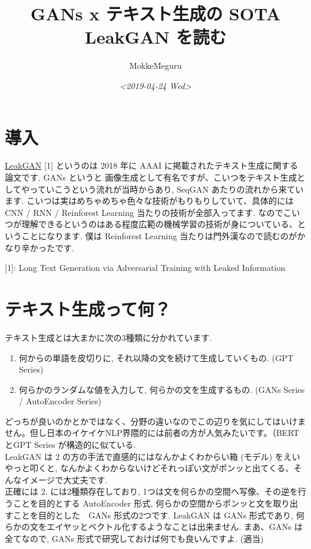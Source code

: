 \documentclass[a4paper, dvipdfmx, 10pt]{article}
\author{MokkeMeguru}
\date{\textit{<2019-04-24 Wed>}}
\title{GANs x テキスト生成の SOTA LeakGAN を読む}
\begin{document}
\maketitle
\tableofcontents

\section{導入}
\label{sec:org51e9dc4}
\href{https://arxiv.org/pdf/1709.08624v2.pdf}{LeakGAN} [1] というのは 2018 年に AAAI に掲載されたテキスト生成に関する論文です. GANs というと 画像生成として有名ですが、こいつをテキスト生成としてやっていこうという流れが当時からあり, SeqGAN あたりの流れから来ています. こいつは実はめちゃめちゃ色々な技術がもりもりしていて、具体的には CNN / RNN / Reinforest Learning 当たりの技術が全部入ってます. なのでこいつが理解できるというのはある程度広範の機械学習の技術が身についている、ということになります. 僕は Reinforest Learning 当たりは門外漢なので読むのがかなり辛かったです.

[1]: Long Text Generation via Adversarial Training with Leaked Information
\section{テキスト生成って何？}
\label{sec:orga934a04}
テキスト生成とは大まかに次の3種類に分かれています.
\begin{enumerate}
\item 何からの単語を皮切りに, それ以降の文を続けて生成していくもの. (GPT Series)
\item 何らかのランダムな値を入力して, 何らかの文を生成するもの. (GANs Series / AutoEncoder Series)
\end{enumerate}

どっちが良いのかとかではなく、分野の違いなのでこの辺りを気にしてはいけません。但し日本のイケイケNLP界隈的には前者の方が人気みたいです。（BERTとGPT Series が構造的に似ている.\\
LeakGAN は 2 の方の手法で直感的にはなんかよくわからい箱 (モデル) をえいやっと叩くと, なんかよくわからないけどそれっぽい文がポンッと出てくる、そんなイメージで大丈夫です.\\

正確には 2. には2種類存在しており, 1つは文を何らかの空間へ写像、その逆を行うことを目的とする AutoEncoder 形式, 何らかの空間からポンッと文を取り出すことを目的とした　GANs 形式の2つです. LeakGAN は GANs 形式であり, 何らかの文をエイヤッとベクトル化するようなことは出来ません. まあ、GANs は全てなので, GANs 形式で研究しておけば何でも良いんですよ. (適当)
\end{document}
